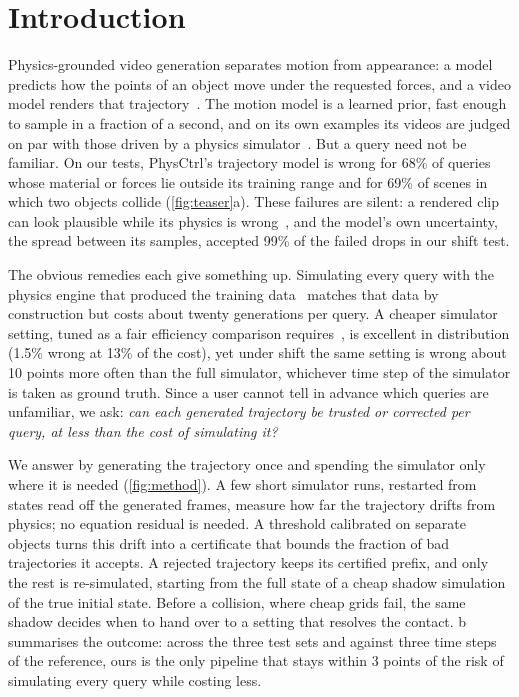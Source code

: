 \section{Introduction}
\label{sec:intro}

Physics-grounded video generation separates motion from appearance: a model predicts how the points of an object move under the requested forces, and a video model renders that trajectory~\cite{wang2025physctrl}.
The motion model is a learned prior, fast enough to sample in a fraction of a second, and on its own examples its videos are judged on par with those driven by a physics simulator~\cite{wang2025physctrl}.
But a query need not be familiar.
On our tests, PhysCtrl's trajectory model is wrong for 68\% of queries whose material or forces lie outside its training range and for 69\% of scenes in which two objects collide (\cref{fig:teaser}a).
These failures are silent: a rendered clip can look plausible while its physics is wrong~\cite{khanbayov2026physweep}, and the model's own uncertainty, the spread between its samples, accepted 99\% of the failed drops in our shift test.

The obvious remedies each give something up.
Simulating every query with the physics engine that produced the training data~\cite{foo2026physical, liu2026realwonder} matches that data by construction but costs about twenty generations per query.
A cheaper simulator setting, tuned as a fair efficiency comparison requires~\cite{mcgreivy2024weak}, is excellent in distribution (1.5\% wrong at 13\% of the cost), yet under shift the same setting is wrong about 10 points more often than the full simulator, whichever time step of the simulator is taken as ground truth.
Since a user cannot tell in advance which queries are unfamiliar, we ask: \emph{can each generated trajectory be trusted or corrected per query, at less than the cost of simulating it?}

We answer by generating the trajectory once and spending the simulator only where it is needed (\cref{fig:method}).
A few short simulator runs, restarted from states read off the generated frames, measure how far the trajectory drifts from physics; no equation residual is needed.
A threshold calibrated on separate objects turns this drift into a certificate that bounds the fraction of bad trajectories it accepts.
A rejected trajectory keeps its certified prefix, and only the rest is re-simulated, starting from the full state of a cheap shadow simulation of the true initial state.
Before a collision, where cheap grids fail, the same shadow decides when to hand over to a setting that resolves the contact.
b summarises the outcome: across the three test sets and against three time steps of the reference, ours is the only pipeline that stays within 3 points of the risk of simulating every query while costing less.

